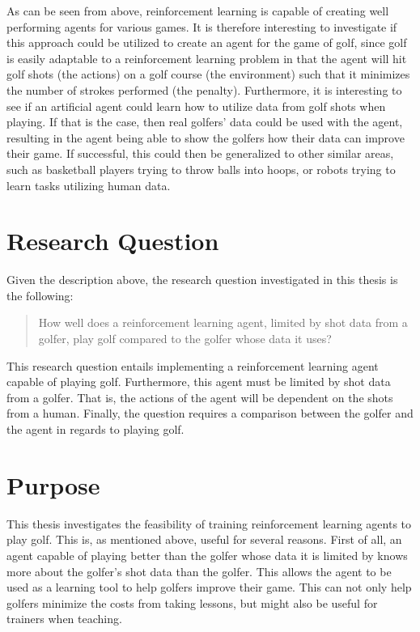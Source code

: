 \documentclass{kththesis}
\begin{document}
As can be seen from above, reinforcement learning is capable of creating well performing agents for various games. It is therefore interesting to investigate if this approach could be utilized to create an agent for the game of golf, since golf is easily adaptable to a reinforcement learning problem in that the agent will hit golf shots (the actions) on a golf course (the environment) such that it minimizes the number of strokes performed (the penalty). Furthermore, it is interesting to see if an artificial agent could learn how to utilize data from golf shots when playing. If that is the case, then real golfers' data could be used with the agent, resulting in the agent being able to show the golfers how their data can improve their game. If successful, this could then be generalized to other similar areas, such as basketball players trying to throw balls into hoops, or robots trying to learn tasks utilizing human data.

\section{Research Question}
Given the description above, the research question investigated in this thesis is the following:
\begin{quote}
    How well does a reinforcement learning agent, limited by shot data from a golfer, play golf compared to the golfer whose data it uses?
\end{quote}
This research question entails implementing a reinforcement learning agent capable of playing golf. Furthermore, this agent must be limited by shot data from a golfer. That is, the actions of the agent will be dependent on the shots from a human. Finally, the question requires a comparison between the golfer and the agent in regards to playing golf. 

\section{Purpose}
This thesis investigates the feasibility of training reinforcement learning agents to play golf. This is, as mentioned above, useful for several reasons. First of all, an agent capable of playing better than the golfer whose data it is limited by knows more about the golfer's shot data than the golfer. This allows the agent to be used as a learning tool to help golfers improve their game. This can not only help golfers minimize the costs from taking lessons, but might also be useful for trainers when teaching.
\end{document}
